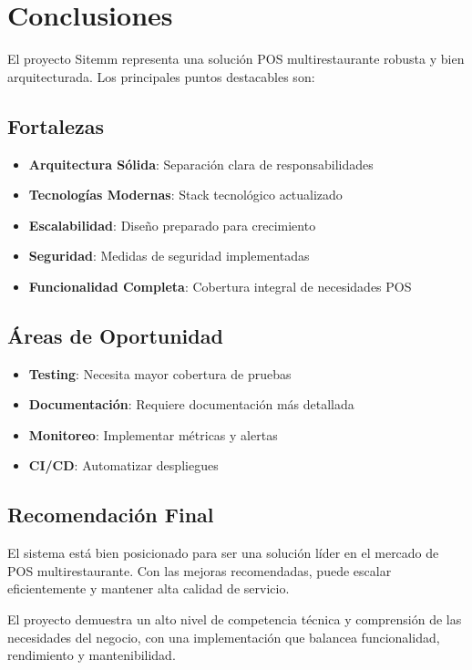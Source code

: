 \documentclass[12pt,a4paper]{article}
\begin{document}
\section{Conclusiones}

El proyecto Sitemm representa una solución POS multirestaurante robusta y bien arquitecturada. Los principales puntos destacables son:

\subsection{Fortalezas}
\begin{itemize}
    \item \textbf{Arquitectura Sólida}: Separación clara de responsabilidades
    \item \textbf{Tecnologías Modernas}: Stack tecnológico actualizado
    \item \textbf{Escalabilidad}: Diseño preparado para crecimiento
    \item \textbf{Seguridad}: Medidas de seguridad implementadas
    \item \textbf{Funcionalidad Completa}: Cobertura integral de necesidades POS
\end{itemize}

\subsection{Áreas de Oportunidad}
\begin{itemize}
    \item \textbf{Testing}: Necesita mayor cobertura de pruebas
    \item \textbf{Documentación}: Requiere documentación más detallada
    \item \textbf{Monitoreo}: Implementar métricas y alertas
    \item \textbf{CI/CD}: Automatizar despliegues
\end{itemize}

\subsection{Recomendación Final}
El sistema está bien posicionado para ser una solución líder en el mercado de POS multirestaurante. Con las mejoras recomendadas, puede escalar eficientemente y mantener alta calidad de servicio.

El proyecto demuestra un alto nivel de competencia técnica y comprensión de las necesidades del negocio, con una implementación que balancea funcionalidad, rendimiento y mantenibilidad.
\end{document}
